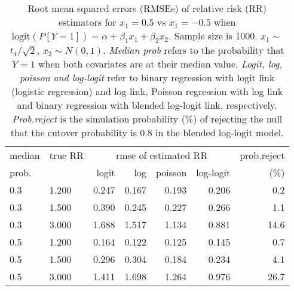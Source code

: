 \documentclass[12pt,a4paper]{article}
\begin{document}
\begin{table}[H] 
\small\sf\centering 
\caption{Root mean squared errors (RMSEs) of relative risk (RR) estimators for $x_1=0.5$ vs $x_1=-0.5$ when $\mbox{logit}(P[Y=1])=\alpha+\beta_1 x_1 + \beta_2 x_2$. Sample size is 1000. $x_1 \sim $$t_4/\sqrt{2}$, $x_2 \sim N(0,1)$. {\it Median prob} refers to the probability that $Y=1$ when both covariates are at their median value. {\it Logit, log, poisson and log-logit} refer to binary regression with logit link (logistic regression) and log link, Poisson regression with log link and binary regression with blended log-logit link, respectively. {\it Prob.reject} is the simulation probability (\%) of rejecting the null that the cutover probability is $0.8$ in the blended log-logit model.} 
\begin{tabular}{llrrrrr} 
\toprule 
median & true RR & \multicolumn{4}{c}{rmse of estimated RR} & prob.reject \\ 
prob. & & logit & log & poisson & log-logit  & (\%) \\ \midrule 
0.3 & 1.200 & 0.247 & 0.167 & 0.193 & 0.206 &  0.2 \\  
0.3 & 1.500 & 0.390 & 0.245 & 0.227 & 0.266 &  1.1 \\  
0.3 & 3.000 & 1.688 & 1.517 & 1.134 & 0.881 & 14.6 \\  
0.5 & 1.200 & 0.164 & 0.122 & 0.125 & 0.145 &  0.7 \\  
0.5 & 1.500 & 0.296 & 0.304 & 0.184 & 0.234 &  4.1 \\  
0.5 & 3.000 & 1.411 & 1.698 & 1.264 & 0.976 & 26.7 \\  
\bottomrule 
\end{tabular} 
\end{table} 
\end{document}
